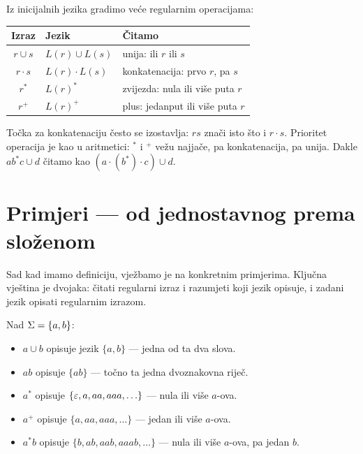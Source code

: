Iz inicijalnih jezika gradimo veće regularnim operacijama:

\begin{center}
\renewcommand{\arraystretch}{1.5}
\begin{tabular}{cll}
\hline
\textbf{Izraz} & \textbf{Jezik} & \textbf{Čitamo} \\
\hline
$r \cup s$  & $L(r) \cup L(s)$   & unija: ili $r$ ili $s$ \\
$r \cdot s$ & $L(r) \cdot L(s)$  & konkatenacija: prvo $r$, pa $s$ \\
$r^*$       & $L(r)^*$           & zvijezda: nula ili više puta $r$ \\
$r^+$       & $L(r)^+$           & plus: jedanput ili više puta $r$ \\
\hline
\end{tabular}
\end{center}

Točka za konkatenaciju često se izostavlja: $rs$ znači isto što i $r \cdot s$.
Prioritet operacija je kao u aritmetici: ${}^*$ i ${}^+$ vežu najjače, pa
konkatenacija, pa unija. Dakle $ab^*c \cup d$ čitamo kao
$(a \cdot (b^*) \cdot c) \cup d$.

\section{Primjeri --- od jednostavnog prema složenom}

Sad kad imamo definiciju, vježbamo je na konkretnim primjerima. Ključna
vještina je dvojaka: čitati regularni izraz i razumjeti koji jezik opisuje,
i zadani jezik opisati regularnim izrazom.

\begin{primjer}
Nad $\Sigma = \{a, b\}$:
\begin{itemize}
  \item $a \cup b$ opisuje jezik $\{a, b\}$ --- jedna od ta dva slova.
  \item $ab$ opisuje $\{ab\}$ --- točno ta jedna dvoznakovna riječ.
  \item $a^*$ opisuje $\{\varepsilon, a, aa, aaa, \ldots\}$ --- nula ili više $a$-ova.
  \item $a^+$ opisuje $\{a, aa, aaa, \ldots\}$ --- jedan ili više $a$-ova.
  \item $a^* b$ opisuje $\{b, ab, aab, aaab, \ldots\}$ --- nula ili više $a$-ova, pa jedan $b$.
\end{itemize}
\end{primjer}

